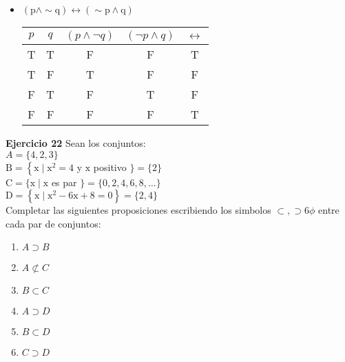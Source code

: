 \documentclass[a4paper,12pt]{article}
\begin{document}
\begin{itemize}
    \item $(\mathrm{p} \wedge \sim \mathrm{q}) \leftrightarrow(\sim \mathrm{p} \wedge \mathrm{q})$
\begin{table}[H]
\begin{tabular}{@{}c|c|c|c|c@{}}
\toprule
$p$ & $q$ & $(p\land \neg q)$ & $(\neg p \land q)$ & $\leftrightarrow$ \\ \midrule
T   & T   & F                 & F                  & T                 \\
T   & F   & T                 & F                  & F                 \\
F   & T   & F                 & T                  & F                 \\
F   & F   & F                 & F                  & T                 \\ \bottomrule
\end{tabular}
\end{table}
\end{itemize}


\textbf{Ejercicio 22}
Sean los conjuntos:\\
$A=\{4,2,3\}$\\
$\mathrm{B}=\left\{\mathrm{x} \mid \mathrm{x}^{2}=4\right.$ y $\mathrm{x}$ positivo $\} = \{2\}$\\
$\mathrm{C}=\{\mathrm{x} \mid \mathrm{x}$ es par $\}=\{0,2,4,6,8,…\}$\\
$\mathrm{D}=\left\{\mathrm{x} \mid \mathrm{x}^{2}-6 \mathrm{x}+8=0\right\}=\{2,4\}$\\
Completar las siguientes proposiciones escribiendo los simbolos $\subset, \supset 6 \phi$ entre cada par de conjuntos:

\begin{enumerate}
\item $A\supset B$
\item $A\not\subset C$
\item $B\subset C$
\item $A\supset D$
\item $B\subset D$
\item $C \supset D$
\end{enumerate}
\end{document}
